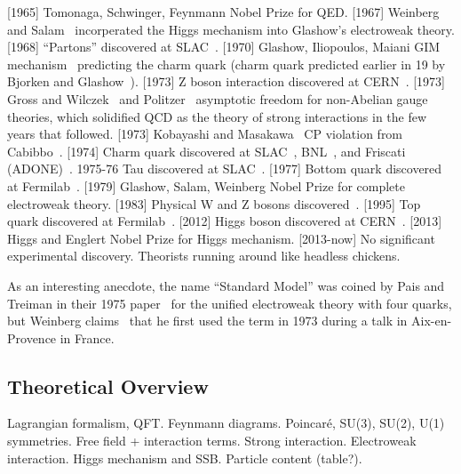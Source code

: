 [1965] Tomonaga, Schwinger, Feynmann Nobel Prize for QED.
[1967] Weinberg~\cite{Weinberg1967Electroweak} and Salam~\cite{Salam1968Electroweak} incorperated the Higgs mechanism into Glashow's electroweak theory.
[1968] ``Partons'' discovered at SLAC~\cite{SLAC1969Partons-1, SLAC1969Partons-2}.
[1970] Glashow, Iliopoulos, Maiani GIM mechanism~\cite{GIM1970GIMMechanism} predicting the charm quark (charm quark predicted earlier in 19 by Bjorken and Glashow~\cite{BjorkenGlashow1964CharmPrediction}).
[1973] Z boson interaction discovered at CERN~\cite{CERN1973ZInteraction-1, CERN1973ZInteraction-2, CERN1973ZInteraction-3}.
[1973] Gross and Wilczek~\cite{GrossWilczek1973AsymptoticFreedom} and Politzer~\cite{Politzer1973AsymptoticFreedom} asymptotic freedom for non-Abelian gauge theories,
which solidified QCD as the theory of strong interactions in the few years that followed.
[1973] Kobayashi and Masakawa~\cite{KobayashiMasakawa1973CKMMatrix} CP violation from Cabibbo~\cite{Cabibbo1963CabbiboMatrix}.
[1974] Charm quark discovered at SLAC~\cite{SLACLBL1974CharmDiscovery}, BNL~\cite{BNLMIT1974CharmDiscovery}, and Friscati (ADONE)~\cite{Frascati1974CharmDiscovery}.
1975-76 Tau discovered at SLAC~\cite{PerlSLAC1975TauEvidence-1, PerlSLAC1976TauEvidence-2, PerlSLAC1977TauDiscovery}.
[1977] Bottom quark discovered at Fermilab~\cite{Fermilab1977BottomQuarkDiscovery}.
[1979] Glashow, Salam, Weinberg Nobel Prize for complete electroweak theory.
[1983] Physical W and Z bosons discovered~\cite{CERN1983WDiscovery-1, CERN1983WDiscovery-2, CERN1983ZDiscovery-1, CERN1983ZDiscovery-2}.
[1995] Top quark discovered at Fermilab~\cite{Fermilab1995TopQuarkDiscovery-1,Fermilab1995TopQuarkDiscovery-2}.
[2012] Higgs boson discovered at CERN~\cite{CMS2012HiggsDiscovery, ATLAS2012HiggsDiscovery}.
[2013] Higgs and Englert Nobel Prize for Higgs mechanism.
[2013-now] No significant experimental discovery. Theorists running around like headless chickens.

As an interesting anecdote, the name ``Standard Model'' was coined by Pais and Treiman in their 1975 paper~\cite{PaisTreiman1975SMName}
for the unified electroweak theory with four quarks,
but Weinberg claims~\cite{WeinbergInterview2018} that he first used the term in 1973 during a talk in Aix-en-Provence in France.

\subsection{Theoretical Overview}
Lagrangian formalism, QFT.
Feynmann diagrams.
Poincar\'{e}, SU(3), SU(2), U(1) symmetries.
Free field + interaction terms.
Strong interaction.
Electroweak interaction.
Higgs mechanism and SSB.
Particle content (table?).

